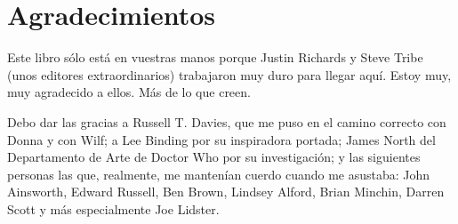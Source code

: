 \chapter*{Agradecimientos}

Este libro sólo está en vuestras manos porque Justin Richards y Steve
Tribe (unos editores extraordinarios) trabajaron muy duro para llegar
aquí. Estoy muy, muy agradecido a ellos. Más de lo que creen.

Debo dar las gracias a Russell T. Davies, que me puso en el camino
correcto con Donna y con Wilf; a Lee Binding por su inspiradora portada;
James North del Departamento de Arte de Doctor Who por su investigación;
y las siguientes personas las que, realmente, me mantenían cuerdo cuando
me asustaba: John Ainsworth, Edward Russell, Ben Brown, Lindsey Alford,
Brian Minchin, Darren Scott y más especialmente Joe Lidster.
